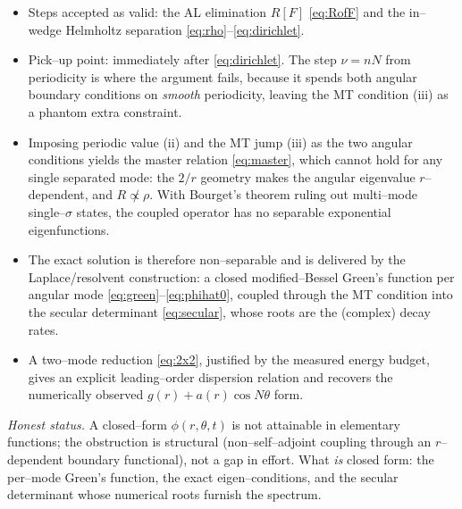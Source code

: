 \documentclass{article}
\begin{document}
\begin{itemize}
\item Steps accepted as valid: the AL elimination $R[F]$ \eqref{eq:RofF} and the
in--wedge Helmholtz separation \eqref{eq:rho}--\eqref{eq:dirichlet}.
\item Pick--up point: immediately after \eqref{eq:dirichlet}. The step
$\nu=nN$ from periodicity is where the argument fails, because it spends both
angular boundary conditions on \emph{smooth} periodicity, leaving the MT
condition (iii) as a phantom extra constraint.
\item Imposing periodic value (ii) and the MT jump (iii) as the two angular
conditions yields the master relation \eqref{eq:master}, which cannot hold for
any single separated mode: the $2/r$ geometry makes the angular eigenvalue
$r$--dependent, and $R\not\propto\rho$. With Bourget's theorem ruling out
multi--mode single--$\sigma$ states, the coupled operator has no separable
exponential eigenfunctions.
\item The exact solution is therefore non--separable and is delivered by the
Laplace/resolvent construction: a closed modified--Bessel Green's function per
angular mode \eqref{eq:green}--\eqref{eq:phihat0}, coupled through the MT
condition into the secular determinant \eqref{eq:secular}, whose roots are the
(complex) decay rates.
\item A two--mode reduction \eqref{eq:2x2}, justified by the measured energy
budget, gives an explicit leading--order dispersion relation and recovers the
numerically observed $g(r)+a(r)\cos N\theta$ form.
\end{itemize}

\noindent\textit{Honest status.} A closed--form $\phi(r,\theta,t)$ is not
attainable in elementary functions; the obstruction is structural
(non--self--adjoint coupling through an $r$--dependent boundary functional), not
a gap in effort. What \emph{is} closed form: the per--mode Green's function, the
exact eigen--conditions, and the secular determinant whose numerical roots
furnish the spectrum.
\end{document}
